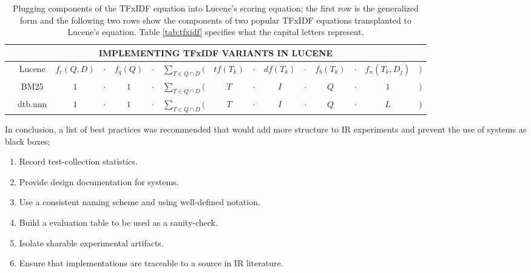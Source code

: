 \begin{table}[bht!]
  \centering
  \begin{tabular}{lcccccccccccccc}
    \multicolumn{15}{c}{IMPLEMENTING TFxIDF VARIANTS IN LUCENE}
    \\
    \hline\hline

    & Lucene  & $f_{c}(Q,D)$     & $\cdot$ & $f_{q}(Q)$
    & $\cdot$ & $\displaystyle\sum_{T \in Q \cap D}($     & $tf(T_{k})$
    & $\cdot$ & $df(T_{k})$      & $\cdot$ & $f_{b}(T_{k})$
    & $\cdot$ & $f_{n}(T_{k}, D_{j})$      & $)$ \\
    
    & BM25    & $1$              &  $\cdot$ & $1$
    & $\cdot$ & $\displaystyle\sum_{T \in Q \cap D}($      & $T$
    & $\cdot$ & $I$              & $\cdot$  & $Q$
    & $\cdot$ & $1$              & $)$ \\

    & dtb.nnn & $1$              & $\cdot$ & $1$
    & $\cdot$ & $\displaystyle\sum_{T \in Q \cap D}($     & $T$
    & $\cdot$ & $I$              & $\cdot$ & $Q$
    & $\cdot$ & $L$              & $)$ \\

    \hline\hline
  \end{tabular}

  \caption{Plugging components of the TFxIDF equation into Lucene's
    scoring equation; the first row is the generalized form and the
    following two rows show the components of two popular TFxIDF
    equations transplanted to Lucene's equation. Table
    \ref{tab:tfxidf} specifies what the capital letters represent.}

  \label{tab:lucene}

\end{table}

In conclusion, a list of best practices was recommended that would add
more structure to IR experiments and prevent the use of systems as
black boxes;

\begin{enumerate}

\item Record test-collection statistics.

\item Provide design documentation for systems.

\item Use a consistent naming scheme and using well-defined notation.

\item Build a evaluation table to be used as a sanity-check.

\item Isolate sharable experimental artifacts.

\item Ensure that implementations are traceable to a source in IR
  literature.

\end{enumerate}

